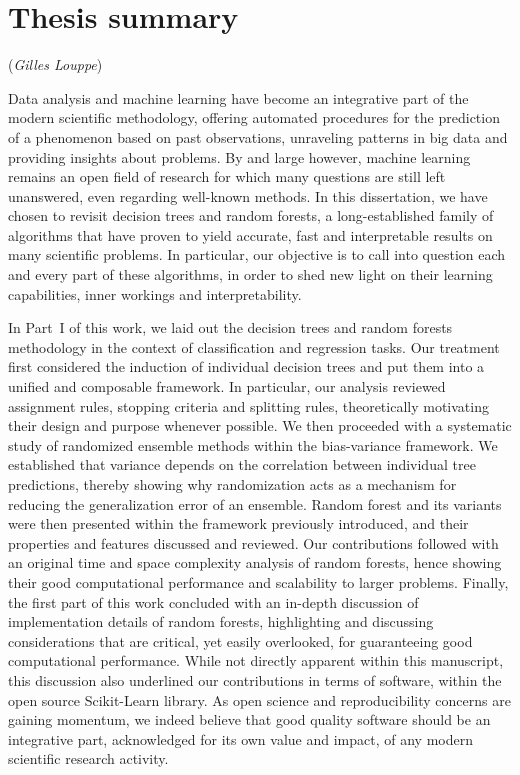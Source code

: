 \chapter{Thesis summary}

\vspace{-3.5em}
\hfill (\textit{Gilles Louppe})
\vspace{2.5em}

Data analysis and machine learning have become an integrative part of the
modern scientific methodology, offering automated procedures for the prediction
of a phenomenon based on past observations, unraveling patterns in big data and
providing insights about problems. By and large however, machine learning
remains an open field of research for which many questions are still left
unanswered, even regarding well-known methods. In this dissertation, we have
chosen to revisit decision trees and random forests, a long-established family
of algorithms that have proven to yield accurate, fast and interpretable results
on many scientific problems. In particular, our objective is to call into
question each and every part of these algorithms, in order to shed new light on
their learning capabilities, inner workings and interpretability.

In Part~\textsc{I} of this work, we laid out the decision trees and
random forests methodology in the context of classification and regression
tasks. Our treatment first considered the induction of individual decision
trees and put them into a unified and composable framework. In particular, our
analysis reviewed assignment rules, stopping criteria and splitting rules,
theoretically motivating their design and purpose whenever possible. We then
proceeded with a systematic study of randomized ensemble methods within the
bias-variance framework. We established that variance depends on the
correlation between individual tree predictions, thereby showing why
randomization acts as a mechanism for reducing the generalization error of an
ensemble.  Random forest and its variants were then presented within the
framework previously introduced, and their properties and features discussed
and reviewed. Our contributions followed with an original time and space
complexity analysis of random forests, hence showing their good computational
performance and scalability to larger problems. Finally, the first part of this
work concluded with an in-depth discussion of implementation details of random
forests, highlighting and discussing considerations that are critical, yet
easily overlooked, for guaranteeing good computational performance. While not
directly apparent within this manuscript, this discussion also underlined our
contributions in terms of software, within the open source Scikit-Learn library.
As open science and reproducibility concerns are gaining momentum, we indeed
believe that good quality software should be an integrative part, acknowledged
for its own value and impact, of any modern scientific research activity.

